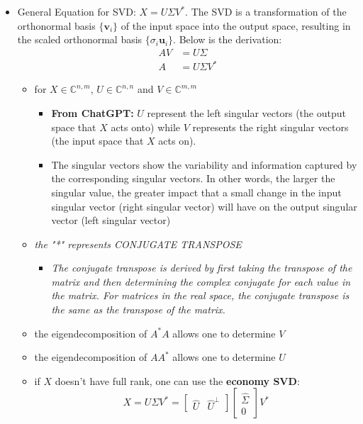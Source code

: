 \documentclass[11.5pt,a4paper]{article}
\begin{document}
\begin{itemize}
    \item General Equation for SVD: $X = U\Sigma V^{*}$. The SVD is a transformation of the orthonormal basis \( \{ \mathbf{v}_i \} \) of the input space into the output space, resulting in the scaled orthonormal basis \( \{ \sigma_i \mathbf{u}_i \} \).
 Below is the derivation:
    \begin{align*}
        AV &= U\Sigma \\
        A &= U\Sigma V^*
    \end{align*}
    \begin{itemize}
        \item for $X \in \mathbb{C}^{n,m}$, $U \in \mathbb{C}^{n,n}$ and $V \in \mathbb{C}^{m,m}$
        \begin{itemize}
            \item \textbf{From ChatGPT:} $U$ represent the left singular vectors (the output space that $X$ acts onto) while $V$ represents the right singular vectors (the input space that $X$ acts on). 
            \item The singular vectors show the variability and information captured by the corresponding singular vectors. In other words, the larger the singular value, the greater impact that a small change in the input singular vector (right singular vector) will have on the output singular vector (left singular vector)
        \end{itemize}
        \item \textit{the "*" represents CONJUGATE TRANSPOSE}
        \begin{itemize}
            \item \textit{The conjugate transpose is derived by first taking the transpose of the matrix and then determining the complex conjugate for each value in the matrix. For matrices in the real space, the conjugate transpose is the same as the transpose of the matrix.}
        \end{itemize}
        \item the eigendecomposition of $A^*A$ allows one to determine $V$
        \item the eigendecomposition of $AA^*$ allows one to determine $U$
        \item if $X$ doesn't have full rank, one can use the \textbf{economy SVD}:
        \begin{equation*}
            X = U\Sigma V^* = \begin{bmatrix} \hat U & \hat U^\perp\end{bmatrix}\begin{bmatrix} \hat \Sigma \\ 0 \end{bmatrix}V^*

\end{equation*}
\end{itemize}
\end{itemize}
\end{document}
